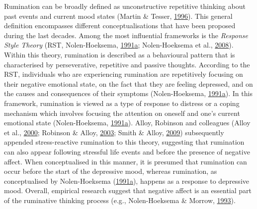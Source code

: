 \documentclass[a4paper,12pt,twoside,openright,oldfontcommands]{memoir}
\begin{document}
Rumination can be broadly defined as unconstructive repetitive thinking about past events and current mood states (Martin \& Tesser, \protect\hyperlink{ref-Martin}{1996}). This general definition encompasses different conceptualisations that have been proposed during the last decades. Among the most influential frameworks is the \emph{Response Style Theory} (RST, Nolen-Hoeksema, \protect\hyperlink{ref-nolen-hoeksema_responses_1991}{1991}\protect\hyperlink{ref-nolen-hoeksema_responses_1991}{a}; Nolen-Hoeksema et al., \protect\hyperlink{ref-Nolen-Hoeksema2008}{2008}). Within this theory, rumination is described as a behavioural pattern that is characterised by perseverative, repetitive and passive thoughts. According to the RST, individuals who are experiencing rumination are repetitively focusing on their negative emotional state, on the fact that they are feeling depressed, and on the causes and consequences of their symptoms (Nolen-Hoeksema, \protect\hyperlink{ref-nolen-hoeksema_responses_1991}{1991}\protect\hyperlink{ref-nolen-hoeksema_responses_1991}{a}). In this framework, rumination is viewed as a type of response to distress or a coping mechanism which involves focusing the attention on oneself and one's current emotional state (Nolen-Hoeksema, \protect\hyperlink{ref-nolen-hoeksema_responses_1991}{1991}\protect\hyperlink{ref-nolen-hoeksema_responses_1991}{a}). Alloy, Robinson and colleagues (Alloy et al., \protect\hyperlink{ref-alloy_temple-wisconsin_2000}{2000}; Robinson \& Alloy, \protect\hyperlink{ref-Robinson2003}{2003}; Smith \& Alloy, \protect\hyperlink{ref-Smith2009}{2009}) subsequently appended stress-reactive rumination to this theory, suggesting that rumination can also appear following stressful life events and before the presence of negative affect. When conceptualised in this manner, it is presumed that rumination can occur before the start of the depressive mood, whereas rumination, as conceptualised by Nolen-Hoeksema (\protect\hyperlink{ref-nolen-hoeksema_responses_1991}{1991}\protect\hyperlink{ref-nolen-hoeksema_responses_1991}{a}), happens as a response to depressive mood. Overall, empirical research suggest that negative affect is an essential part of the ruminative thinking process (e.g., Nolen-Hoeksema \& Morrow, \protect\hyperlink{ref-nolen-hoeksema_effects_1993}{1993}).
\end{document}

